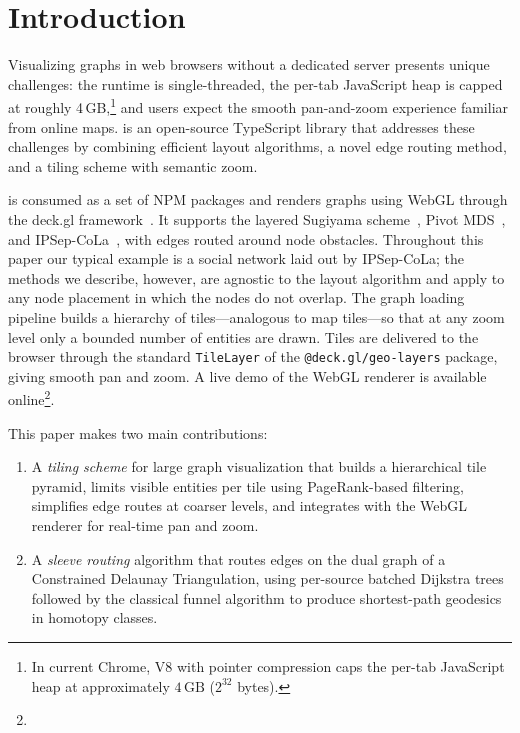 \section{Introduction}
\label{sec:intro}

Visualizing graphs in web browsers without a dedicated server presents
unique challenges: the runtime is single-threaded, the per-tab
JavaScript heap is capped at roughly 4\,GB,\footnote{In current
Chrome, V8 with pointer compression caps the per-tab JavaScript heap
at approximately $4\,\text{GB}$ ($2^{32}$ bytes).} and users expect
the smooth pan-and-zoom experience familiar from online
maps. \msagljs{}
is an open-source TypeScript library that addresses these challenges
by combining efficient layout algorithms, a novel edge routing method,
and a tiling scheme with semantic zoom.

\msagljs{} is consumed as a set of NPM packages and renders graphs
using WebGL through the deck.gl framework~\cite{deckgl}. It supports
the layered Sugiyama scheme~\cite{sugiyama1981}, Pivot
MDS~\cite{brandes2007eigensolver}, and
IPSep-CoLa~\cite{dwyer2006ipsepcola}, with edges routed around node
obstacles. Throughout this paper our typical example is a social
network laid out by IPSep-CoLa; the methods we describe, however, are
agnostic to the layout algorithm and apply to any node placement in
which the nodes do not overlap. The graph loading pipeline builds a
hierarchy of tiles---analogous to map tiles---so that at any zoom
level only a bounded number of entities are drawn. Tiles are delivered
to the browser through the standard \texttt{TileLayer} of the
\texttt{@deck.gl/geo-layers} package, giving smooth pan and zoom. A live
demo of the WebGL renderer is available
online\footnote{}.

This paper makes two main contributions:
\begin{enumerate}
\item A \emph{tiling scheme} for large graph visualization that builds a hierarchical tile pyramid, limits visible entities per tile using PageRank-based filtering, simplifies edge routes at coarser levels, and integrates with the WebGL renderer for real-time pan and zoom.
\item A \emph{sleeve routing} algorithm that routes edges on the dual graph of a Constrained Delaunay Triangulation, using per-source batched Dijkstra trees followed by the classical funnel algorithm to produce shortest-path geodesics in homotopy classes.
\end{enumerate}

